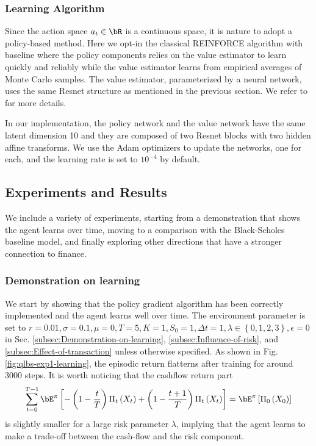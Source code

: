 \subsubsection{Learning Algorithm}

Since the action space $a_{t}\in\bR$ is a continuous space, it is
nature to adopt a policy-based method. Here we opt-in the classical
REINFORCE algorithm with baseline where the policy components relies
on the value estimator to learn quickly and reliably while the value
estimator learns from empirical averages of Monte Carlo samples. The
value estimator, parameterized by a neural network, uses the same
Resnet structure as mentioned in the previous section. We refer to
\cite{sutton2018reinforcement} for more details.

In our implementation, the policy network and the value network have
the same latent dimension 10 and they are composed of two Resnet blocks
with two hidden affine transforms. We use the Adam optimizers to update
the networks, one for each, and the learning rate is set to $10^{-4}$
by default.

\subsection{Experiments and Results}

We include a variety of experiments, starting from a demonstration
that shows the agent learns over time, moving to a comparison with
the Black-Scholes baseline model, and finally exploring other directions
that have a stronger connection to finance.

\subsubsection{Demonstration on learning\label{subsec:Demonstration-on-learning}}

We start by showing that the policy gradient algorithm has been correctly
implemented and the agent learns well over time. The environment parameter
is set to $r=0.01,\sigma=0.1,\mu=0,T=5,K=1,S_{0}=1,\Delta t=1,\lambda\in\left\{ 0,1,2,3\right\} ,\epsilon=0$
in Sec. \ref{subsec:Demonstration-on-learning}, \ref{subsec:Influence-of-risk},
and \ref{subsec:Effect-of-transaction} unless otherwise specified.
As shown in Fig. \ref{fig:qlbs-exp1-learning}, the episodic return
flatterns after training for around 3000 steps. It is worth noticing
that the cashflow return part 
\[
\sum_{t=0}^{T-1}\bE^{\pi}\left[-\left(1-\frac{t}{T}\right)\Pi_{t}\left(X_{t}\right)+\left(1-\frac{t+1}{T}\right)\Pi_{t}\left(X_{t}\right)\right]=\bE^{\pi}\left[\Pi_{0}\left(X_{0}\right)\right]
\]
is slightly smaller for a large risk parameter $\lambda$, implying
that the agent learns to make a trade-off between the cash-flow and
the risk component. 

